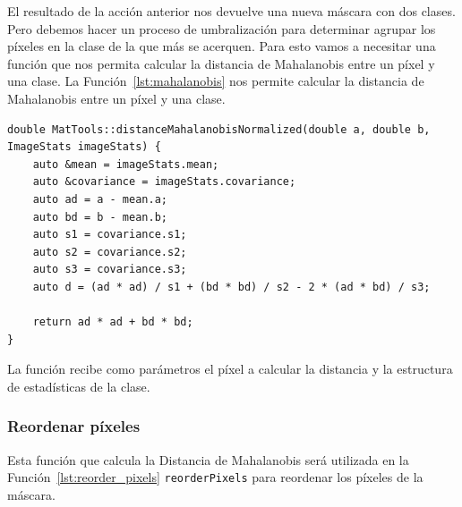 El resultado de la acción anterior nos devuelve una nueva máscara con dos clases.
Pero debemos hacer un proceso de umbralización para determinar agrupar los píxeles en la clase de la que más se acerquen.
Para esto vamos a necesitar una función que nos permita calcular la distancia de Mahalanobis entre un píxel y una clase.
La Función~\ref{lst:mahalanobis} nos permite calcular la distancia de Mahalanobis entre un píxel y una clase.

\begin{lstlisting}[float=H,caption={Mahalanobis Distance},label={lst:mahalanobis}]
double MatTools::distanceMahalanobisNormalized(double a, double b, ImageStats imageStats) {
    auto &mean = imageStats.mean;
    auto &covariance = imageStats.covariance;
    auto ad = a - mean.a;
    auto bd = b - mean.b;
    auto s1 = covariance.s1;
    auto s2 = covariance.s2;
    auto s3 = covariance.s3;
    auto d = (ad * ad) / s1 + (bd * bd) / s2 - 2 * (ad * bd) / s3;

    return ad * ad + bd * bd;
}
\end{lstlisting}

La función recibe como parámetros el píxel a calcular la distancia y la estructura de estadísticas de la clase.

\subsubsection{Reordenar píxeles}\label{subsubsec:reorder-pixels}
Esta función que calcula la Distancia de Mahalanobis será utilizada en la Función~\ref{lst:reorder_pixels} \texttt{reorderPixels} para reordenar los píxeles de la máscara.

